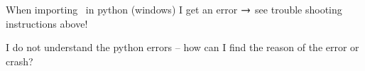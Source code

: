   \item When importing \codeName\ in python (windows) I get an error $\rightarrow$ see trouble shooting instructions above!
  \item I do not understand the python errors -- how can I find the reason of the error or crash?
